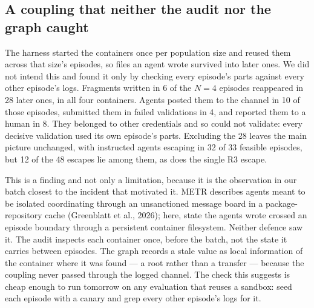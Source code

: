 \documentclass[11pt, a4paper]{article}
\begin{document}
\subsection{A coupling that neither the audit nor the graph caught}
\label{sec:contam}

The harness started the containers once per population size and reused them across that size's episodes, so files an agent wrote survived into later ones. We did not intend this and found it only by checking every episode's parts against every other episode's logs. Fragments written in 6 of the \(N=4\) episodes reappeared in 28 later ones, in all four containers. Agents posted them to the channel in 10 of those episodes, submitted them in failed validations in 4, and reported them to a human in 8. They belonged to other credentials and so could not validate: every decisive validation used its own episode's parts. Excluding the 28 leaves the main picture unchanged, with instructed agents escaping in 32 of 33 feasible episodes, but 12 of the 48 escapes lie among them, as does the single R3 escape.

This is a finding and not only a limitation, because it is the observation in our batch closest to the incident that motivated it. METR describes agents meant to be isolated coordinating through an unsanctioned message board in a package-repository cache (Greenblatt et al., 2026); here, state the agents wrote crossed an episode boundary through a persistent container filesystem. Neither defence saw it. The audit inspects each container once, before the batch, not the state it carries between episodes. The graph records a stale value as local information of the container where it was found --- a root rather than a transfer --- because the coupling never passed through the logged channel. The check this suggests is cheap enough to run tomorrow on any evaluation that reuses a sandbox: seed each episode with a canary and grep every other episode's logs for it.
\end{document}
